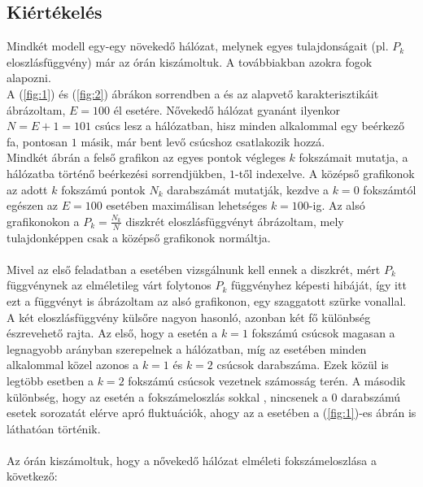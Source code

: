\subsection{Kiértékelés}
Mindkét modell egy-egy növekedő hálózat, melynek egyes tulajdonságait (pl. $P_{k}$ eloszlásfüggvény) már az órán kiszámoltuk. A továbbiakban azokra fogok alapozni. \\
A (\ref{fig:1}) és (\ref{fig:2}) ábrákon sorrendben a \rrt és az \apm alapvető karakterisztikáit ábrázoltam, $E=100$ él esetére. Nővekedő hálózat gyanánt ilyenkor $N = E+1 = 101$ csúcs lesz a hálózatban, hisz minden alkalommal egy beérkező fa, pontosan $1$ másik, már bent levő csúcshoz csatlakozik hozzá. \\
Mindkét ábrán a felső grafikon az egyes pontok végleges $k$ fokszámait mutatja, a hálózatba történő beérkezési sorrendjükben, $1$-től indexelve. A középső grafikonok az adott $k$ fokszámú pontok $N_{k}$ darabszámát mutatják, kezdve a $k=0$ fokszámtól egészen az $E=100$ esetében maximálisan lehetséges $k=100$-ig. Az alsó grafikonokon a $P_k = \frac{N_{k}}{N}$ diszkrét eloszlásfüggvényt ábrázoltam, mely tulajdonképpen csak a középső grafikonok normáltja.
\\ \\
Mivel az első feladatban a \rrt esetében vizsgálnunk kell ennek a diszkrét, mért $P_{k}$ függvénynek az elméletileg várt folytonos $P_{k}$ függvényhez képesti hibáját, így itt ezt a függvényt is ábrázoltam az alsó grafikonon, egy szaggatott szürke vonallal. A két eloszlásfüggvény külsőre nagyon hasonló, azonban két fő különbség észrevehető rajta. Az első, hogy a \rrt esetén a $k=1$ fokszámú csúcsok magasan a legnagyobb arányban szerepelnek a hálózatban, míg az \apm esetében minden alkalommal közel azonos a $k=1$ és $k=2$ csúcsok darabszáma. Ezek közül is legtöbb esetben a $k=2$ fokszámú csúcsok vezetnek számosság terén. A második különbség, hogy az \apm esetén a fokszámeloszlás sokkal , nincsenek a $0$ darabszámú esetek sorozatát elérve apró fluktuációk, ahogy az a \rrt esetében a (\ref{fig:1})-es ábrán is láthatóan történik.
\\ \\
Az órán kiszámoltuk, hogy a nővekedő hálózat elméleti fokszámeloszlása a következő:

